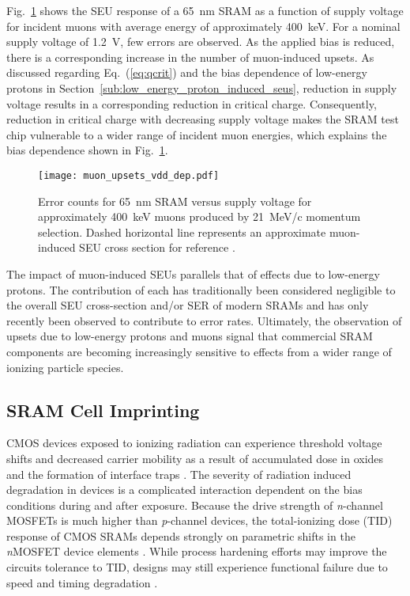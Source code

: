 Fig.~\ref{fig:muon_upsets_bias_dep} shows the SEU response of a 65~nm SRAM as a function of supply voltage for incident muons with average energy of approximately 400~keV. 
For a nominal supply voltage of 1.2~V, few errors are observed. 
As the applied bias is reduced, there is a corresponding increase in the number of muon-induced upsets. 
As discussed regarding Eq.~(\ref{eq:qcrit}) and the bias dependence of low-energy protons in Section~\ref{sub:low_energy_proton_induced_seus}, reduction in supply voltage results in a corresponding reduction in critical charge.
Consequently, reduction in critical charge with decreasing supply voltage makes the SRAM test chip vulnerable to a wider range of incident muon energies, which explains the bias dependence shown in Fig.~\ref{fig:muon_upsets_bias_dep}.
\begin{figure}[htbp]
    \begin{center}
        \texttt{[image: muon\_upsets\_vdd\_dep.pdf]}
    \end{center}
    \caption[Error counts for 65~nm SRAM versus supply voltage for approximately 400~keV muons produced by 21~MeV/c momentum selection. Dashed horizontal line represents an approximate muon-induced SEU cross section for reference.]{Error counts for 65~nm SRAM versus supply voltage for approximately 400~keV muons produced by 21~MeV/c momentum selection. Dashed horizontal line represents an approximate muon-induced SEU cross section for reference \cite{Sierawski:2010cj}.}
    \label{fig:muon_upsets_bias_dep}
\end{figure}

The impact of muon-induced SEUs parallels that of effects due to low-energy protons.
The contribution of each has traditionally been considered negligible to the overall SEU cross-section and/or SER of modern SRAMs and has only recently been observed to contribute to error rates.
Ultimately, the observation of upsets due to low-energy protons and muons signal that commercial SRAM components are becoming increasingly sensitive to effects from a wider range of ionizing particle species.


\subsection{SRAM Cell Imprinting} %
\label{sub:sram_cell_imprinting}
CMOS devices exposed to ionizing radiation can experience threshold voltage shifts and decreased carrier mobility as a result of accumulated dose in oxides and the formation of interface traps \cite{Dressendorfer:1981kg, Galloway:1990kh, Fleetwood:1993vs, Fleetwood:1995tk}. 
The severity of radiation induced degradation in devices is a complicated interaction dependent on the bias conditions during and after exposure. 
Because the drive strength of \emph{n}-channel MOSFETs is much higher than \emph{p}-channel devices, the total-ionizing dose (TID) response of CMOS SRAMs depends strongly on parametric shifts in the \emph{n}MOSFET device elements \cite{Schott:1987cx,Fleetwood:1987cfa}. 
While process hardening efforts may improve the circuits tolerance to TID, designs may still experience functional failure due to speed and timing degradation \cite{Fleetwood:1987cfa,Felix:2006jl}.

